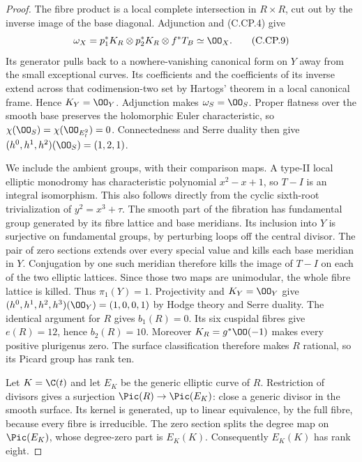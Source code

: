 \begin{proof}
The fibre product is a local complete intersection in
$R\times R$, cut out by the inverse image of the base
diagonal. Adjunction and (C.CP.4) give
\[
 \omega_X=p_1^*K_R\otimes p_2^*K_R\otimes f^*T_B
                         \simeq\OO_X.
 \tag{C.CP.9}
\]
Its generator pulls back to a nowhere-vanishing canonical
form on $Y$ away from the small exceptional curves.
Its coefficients and the coefficients of its inverse
extend across that codimension-two set by Hartogs'
theorem in a local canonical frame. Hence $K_Y=\OO_Y$.
Adjunction makes $\omega_S=\OO_S$. Proper flatness over
the smooth base preserves the holomorphic Euler
characteristic, so $\chi(\OO_S)=\chi(\OO_{E_t^2})=0$.
Connectedness and Serre duality then give
$(h^0,h^1,h^2)(\OO_S)=(1,2,1)$.

We include the ambient groups, with their comparison
maps. A type-II local elliptic monodromy has characteristic
polynomial $x^2-x+1$, so $T-I$ is an integral isomorphism.
This also follows directly from the cyclic sixth-root
trivialization of $y^2=x^3+\tau$. The smooth part of
the fibration has fundamental group generated by its
fibre lattice and base meridians. Its inclusion into
$Y$ is surjective on fundamental groups, by perturbing
loops off the central divisor. The pair of zero sections
extends over every special value and kills each base
meridian in $Y$. Conjugation by one such meridian
therefore kills the image of $T-I$ on each of the two
elliptic lattices. Since those two maps are unimodular,
the whole fibre lattice is killed. Thus $\pi_1(Y)=1$.
Projectivity and $K_Y=\OO_Y$ give
$(h^0,h^1,h^2,h^3)(\OO_Y)=(1,0,0,1)$ by Hodge theory
and Serre duality. The identical argument for $R$ gives
$b_1(R)=0$. Its six cuspidal fibres give $e(R)=12$,
hence $b_2(R)=10$. Moreover $K_R=g^*\OO(-1)$ makes
every positive plurigenus zero. The surface classification
therefore makes $R$ rational, so its Picard group has
rank ten.

Let $K=\C(t)$ and let $E_K$ be the generic elliptic
curve of $R$. Restriction of divisors gives a surjection
$\Pic(R)\to\Pic(E_K)$: close a generic divisor in the
smooth surface. Its kernel is generated, up to linear
equivalence, by the full fibre, because every fibre is
irreducible. The zero section splits the degree map on
$\Pic(E_K)$, whose degree-zero part is $E_K(K)$.
Consequently $E_K(K)$ has rank eight.


\end{proof}
